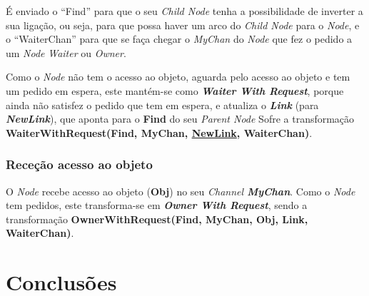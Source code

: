É enviado o ``Find'' para que o seu \emph{Child Node} tenha a possibilidade de inverter a sua ligação, ou seja, para que possa haver um arco do \emph{Child Node} para o \emph{Node}, 
e o ``WaiterChan'' para que se faça chegar o \emph{MyChan} do \emph{Node} que fez o pedido a um \emph{Node} \emph{Waiter} ou \emph{Owner}.

Como o \emph{Node} não tem o acesso ao objeto, aguarda pelo acesso ao objeto e tem um pedido em espera, este mantém-se como \emph{\textbf{Waiter With Request}},
porque ainda não satisfez o pedido que tem em espera, 
e atualiza o \textbf{\emph{Link}} (para \textbf{\emph{NewLink}}), que aponta para o \textbf{Find} do seu \emph{Parent Node}
Sofre a transformação \textbf{WaiterWithRequest(Find, MyChan, \underline{NewLink}, WaiterChan)}.


\subsubsection*{Receção acesso ao objeto}
O \emph{Node} recebe acesso ao objeto (\textbf{Obj}) no seu \emph{Channel \textbf{MyChan}}.
Como o \emph{Node} tem pedidos, este transforma-se em \textbf{\emph{Owner With Request}}, sendo a transformação \textbf{OwnerWithRequest(Find, MyChan, Obj, Link, WaiterChan)}.


\section{Conclusões}
